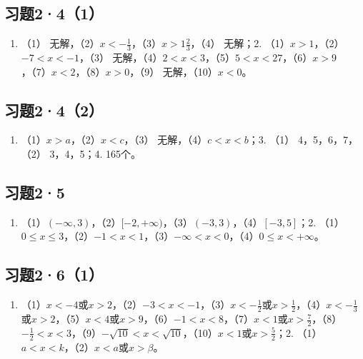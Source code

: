 \subsection{习题2·4（1）}

\begin{enumerate}
\item
  （1）
  无解，（2）\(x < -\frac{1}{3}\)，（3）\(x > 1\frac{2}{3}\)，（4）
  无解；2. （1）\(x > 1\)，（2）\(-7 < x < -1\)，（3）
  无解，（4）\(2 < x < 3\)，（5）\(5 < x < 27\)，（6）\(x > 9\)，（7）\(x < 2\)，（8）\(x > 0\)，（9）
  无解，（10）\(x < 0\)。
\end{enumerate}

\subsection{习题2·4（2）}

\begin{enumerate}[start=2]
\item
  （1）\(x > a\)，（2）\(x < c\)，（3） 无解，（4）\(c < x < b\)；3.
  （1） 4，5，6，7，（2） 3，4，5；4. 165个。
\end{enumerate}

\subsection{习题2·5}

\begin{enumerate}
\item
  （1）\((- \infty, 3)\)，（2）\([-2, +\infty)\)，（3）\((-3, 3)\)，（4）\([-3, 5]\)；2.
  （1）\(0 \leqslant x \leqslant 3\)，（2）\(-1 < x < 1\)，（3）\(-\infty < x < 0\)，（4）\(0 \leqslant x < +\infty\)。
\end{enumerate}

\subsection{习题2·6（1）}

\begin{enumerate}
\item
  （1）\(x < -4\)或\(x > 2\)，（2）\(-3 < x < -1\)，（3）\(x < -\frac{1}{2}\)或\(x > \frac{1}{2}\)，（4）\(x < -\frac{1}{3}\)或\(x > 2\)，（5）\(x < 4\)或\(x > 9\)，（6）\(-1 < x < 8\)，（7）\(x < 1\)或\(x > \frac{7}{2}\)，（8）\(-\frac{1}{2} < x < 3\)，（9）\(-\sqrt{10} < x < \sqrt{10}\)，（10）\(x < 1\)或\(x > \frac{5}{2}\)；2.
  （1）\(a < x < k\)，（2）\(x < a\)或\(x > \beta\)。
\end{enumerate}

